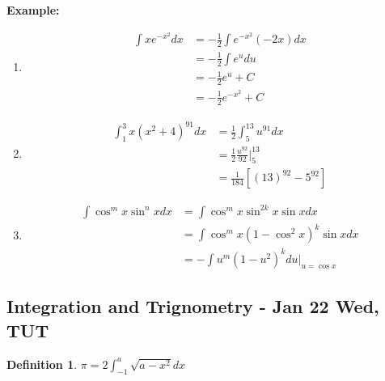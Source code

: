 \documentclass[12pt]{article}
\theoremstyle{plain}
\newtheorem{definition}{Definition}[subsection]
\begin{document}
	{\color{Brown}
	\textbf{Example: }
	\begin{enumerate}
		\item 
			\begin{align*}
			\int xe^{-x^2} dx 
			&= -\frac12 \int e^{-x^2} (-2x) dx\\
			&= -\frac12 \int e^u du \\
			&= -\frac12 e^u + C \\
			&= -\frac12 e^{-x^2} + C
			\end{align*}
			
		\item 
			\begin{align*}
				\int_1^3 x(x^2+4)^{91} dx
				&= \frac 12 \int_5^{13} u^{91} dx\\
				&= \frac 12 \frac{u^{92}}{92} \vert^{13}_5 \\
				&= \frac1{184} [(13)^{92}-5^{92}]
			\end{align*}

		\item 
			\begin{align*}
				\int \cos^m x \sin^n x dx \tag{n \ odd}
				&= \int \cos^m x \sin^{2k} x \sin x dx\\
				&= \int \cos^m x(1-\cos^2 x)^k \sin x dx
				\tag{$ u = \cos x, \  du = -\sin x dx$}\\
				&= -\int u^m(1-u^2)^k du \vert_{u=\cos x}
			\end{align*}
	\end{enumerate}}

\newpage
\subsection{Integration and Trignometry - Jan 22 Wed, TUT}
\begin{definition}
	$\pi = 2\int_{-1}^a \sqrt{a-x^2}dx$ \\
\end{definition}
\end{document}
